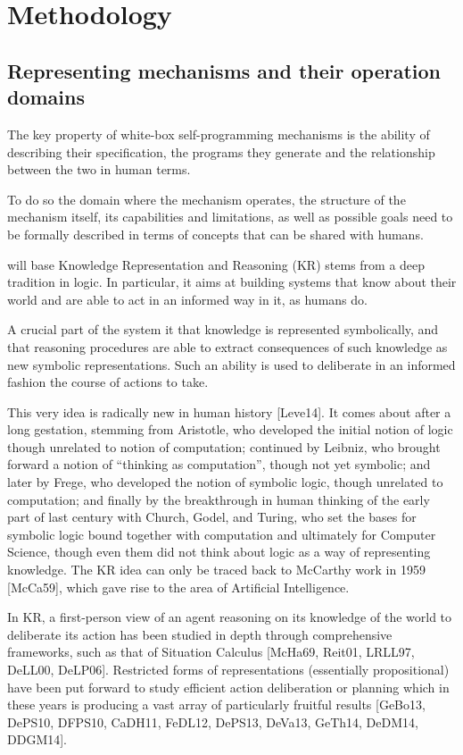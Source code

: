 \section{Methodology}

\subsection{Representing mechanisms and their operation domains}

The key property of white-box self-programming mechanisms is the
ability of describing their specification, the programs they generate
and the relationship between the two in human terms.

To do so the domain where the mechanism operates, the structure of the
mechanism itself, its capabilities and limitations, as well as
possible goals need to be formally described in terms of concepts that
can be shared with humans.

\project will base
Knowledge Representation and Reasoning (KR) stems from a deep
tradition in logic. In particular, it aims at building systems that
know about their world and are able to act in an informed way in it,
as humans do.

A crucial part of the system it that knowledge is represented
symbolically, and that reasoning procedures are able to extract
consequences of such knowledge as new symbolic representations. Such
an ability is used to deliberate in an informed fashion the course of
actions to take.

This very idea is radically new in human history [Leve14]. It comes
about after a long gestation, stemming from Aristotle, who developed
the initial notion of logic though unrelated to notion of computation;
continued by Leibniz, who brought forward a notion of “thinking as
computation”, though not yet symbolic; and later by Frege, who
developed the notion of symbolic logic, though unrelated to
computation; and finally by the breakthrough in human thinking of the
early part of last century with Church, Godel, and Turing, who set the
bases for symbolic logic bound together with computation and
ultimately for Computer Science, though even them did not think about
logic as a way of representing knowledge. The KR idea can only be
traced back to McCarthy work in 1959 [McCa59], which gave rise to the
area of Artificial Intelligence.

In KR, a first-person view of an
agent reasoning on its knowledge of the world to deliberate its action
has been studied in depth through comprehensive frameworks, such as
that of Situation Calculus [McHa69, Reit01, LRLL97, DeLL00,
DeLP06]. Restricted forms of representations (essentially
propositional) have been put forward to study efficient action
deliberation or planning which in these years is producing a vast
array of particularly fruitful results [GeBo13, DePS10, DFPS10,
CaDH11, FeDL12, DePS13, DeVa13, GeTh14, DeDM14, DDGM14]. 


